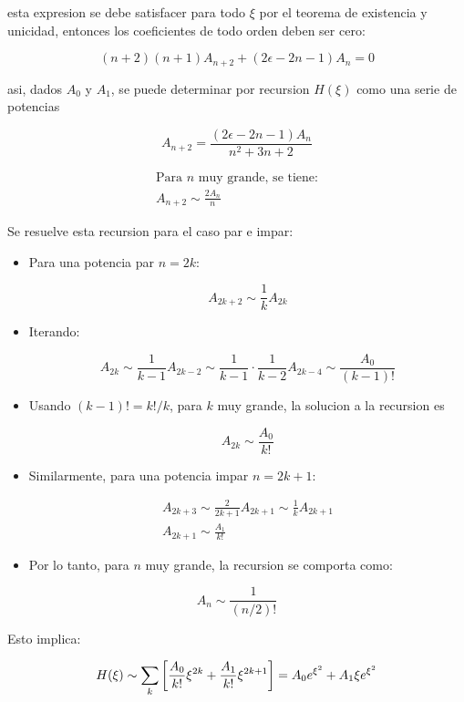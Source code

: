 \documentclass[11pt]{article}
\begin{document}
esta expresion se debe satisfacer para todo \(\xi\) por el teorema de existencia y unicidad, entonces los coeficientes de todo orden deben ser cero:

\[ (n+2)(n+1)A_{n+2} + (2\epsilon - 2n -1)A_n  =0 \]

asi, dados \(A_0\) y \(A_1\), se puede determinar por recursion \(H(\xi)\) como una serie de potencias

\begin{equation}
\label{eq:rec-hermite}
     A_{n+2} = \frac{(2\epsilon - 2n -1)A_n}{n^2 + 3n + 2}
\end{equation}

\begin{gather*}
    \text{Para \(n\) muy grande, se tiene:} \\
    A_{n+2}  \sim \frac{2A_n}{n}
\end{gather*}

Se resuelve esta recursion para el caso par e impar:

\begin{itemize}
\item Para una potencia par \(n=2k\):

\[ A_{2k+2} \sim \frac{1}{k}A_{2k} \]

\item Iterando:

\[ A_{2k} \sim \frac{1}{k-1}A_{2k-2} \sim \frac{1}{k-1}\cdot \frac{1}{k-2}A_{2k-4}\sim \frac{A_0}{(k-1)!} \]

\item Usando \((k-1)! = k!/k\), para \(k\) muy grande, la solucion a la recursion es

\[ A_{2k} \sim \frac{A_0}{k!} \]

\item Similarmente, para una potencia impar \(n = 2k+1\):

\begin{gather*}
A_{2k+3} \sim \frac{2}{2k+1}A_{2k+1} \sim \frac{1}{k}A_{2k+1} \\
A_{2k+1} \sim \frac{A_1}{k!}
\end{gather*}

\item Por lo tanto, para \(n\) muy grande, la recursion se comporta como:
\end{itemize}

\[ A_n \sim \frac{1}{(n/2)!} \]

Esto implica:

\[ H(\xi) \sim \sum_k \qty[\frac{A_0}{k!}\xi^{2k} + \frac{A_1}{k!}\xi^{2k+1}] = A_0e^{\xi^2} + A_1\xi e^{\xi^2} \]
\end{document}
